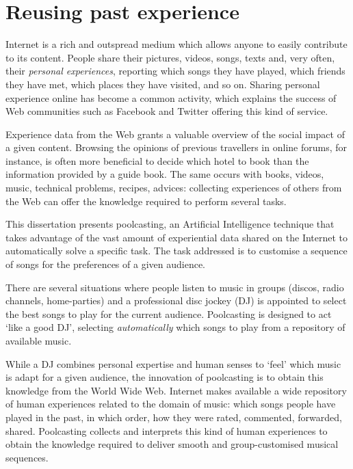\section{Reusing past experience} %

Internet is a rich and outspread medium which allows anyone to easily contribute to its content.
People share their pictures, videos, songs, texts and, very often, their \emph{personal experiences}, reporting which songs they have played, which friends they have met, which places they have visited, and so on. 
Sharing personal experience online has become a common activity, which explains the success of Web communities such as Facebook and Twitter offering this kind of service.

Experience data from the Web grants a valuable overview of the social 
impact of a given content. 
Browsing the opinions of previous travellers in online forums, for instance, is often more beneficial to decide which hotel to book than the information provided by a guide book.
The same occurs with books, videos, music, technical problems, recipes, advices: collecting experiences of others from the Web can offer the knowledge required to perform several tasks.

This dissertation presents poolcasting, an Artificial Intelligence technique that takes advantage of the vast amount of experiential data shared on the Internet to automatically solve a specific task.
The task addressed is to customise a sequence of songs for the preferences of a given audience.

There are several situations where people listen to music in groups (discos, radio channels, home-parties) and a professional disc jockey (DJ) is appointed to select the best songs to play for the current audience.
Poolcasting is designed to act `like a good DJ', selecting \emph{automatically} which songs to play from a repository of available music.

While a DJ combines personal expertise and human senses to `feel' which music is adapt for a given audience, the innovation of poolcasting is to obtain this  knowledge from the World Wide Web. 
Internet makes available a wide repository of human experiences related to the domain of music: which songs people have played in the past, in which order, how they were rated, commented, forwarded, shared.
Poolcasting collects and interprets this kind of human experiences to obtain the knowledge required to deliver smooth and group-customised musical sequences.


